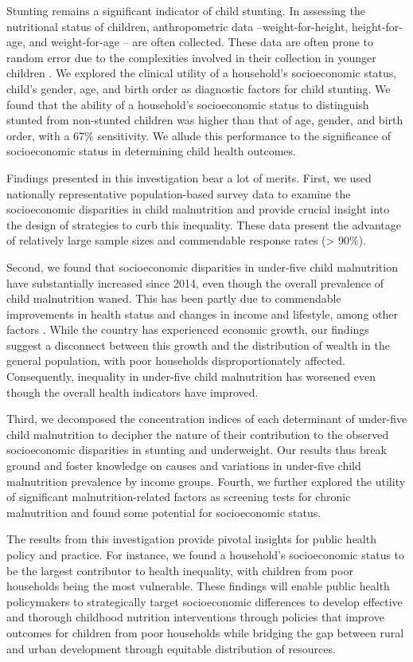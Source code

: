 \documentclass[sn-basic,Numbered,pdflatex]{sn-jnl}
\theoremstyle{remark}
\theoremstyle{definition}
\begin{document}
Stunting remains a significant indicator of child stunting. In assessing
the nutritional status of children, anthropometric data
--weight-for-height, height-for-age, and weight-for-age -- are often
collected. These data are often prone to random error due to the
complexities involved in their collection in younger children
\citep{Farah2019}. We explored the clinical utility of a household's
socioeconomic status, child's gender, age, and birth order as diagnostic
factors for child stunting. We found that the ability of a household's
socioeconomic status to distinguish stunted from non-stunted children
was higher than that of age, gender, and birth order, with a 67\%
sensitivity. We allude this performance to the significance of
socioeconomic status in determining child health outcomes.

Findings presented in this investigation bear a lot of merits. First, we
used nationally representative population-based survey data to examine
the socioeconomic disparities in child malnutrition and provide crucial
insight into the design of strategies to curb this inequality. These
data present the advantage of relatively large sample sizes and
commendable response rates (\textgreater{} 90\%).

Second, we found that socioeconomic disparities in under-five child
malnutrition have substantially increased since 2014, even though the
overall prevalence of child malnutrition waned. This has been partly due
to commendable improvements in health status and changes in income and
lifestyle, among other factors \citep{kien_trends_2016}. While the
country has experienced economic growth, our findings suggest a
disconnect between this growth and the distribution of wealth in the
general population, with poor households disproportionately affected.
Consequently, inequality in under-five child malnutrition has worsened
even though the overall health indicators have improved.

Third, we decomposed the concentration indices of each determinant of
under-five child malnutrition to decipher the nature of their
contribution to the observed socioeconomic disparities in stunting and
underweight. Our results thus break ground and foster knowledge on
causes and variations in under-five child malnutrition prevalence by
income groups. Fourth, we further explored the utility of significant
malnutrition-related factors as screening tests for chronic malnutrition
and found some potential for socioeconomic status.

The results from this investigation provide pivotal insights for public
health policy and practice. For instance, we found a household's
socioeconomic status to be the largest contributor to health inequality,
with children from poor households being the most vulnerable. These
findings will enable public health policymakers to strategically target
socioeconomic differences to develop effective and thorough childhood
nutrition interventions through policies that improve outcomes for
children from poor households while bridging the gap between rural and
urban development through equitable distribution of resources.
\end{document}

